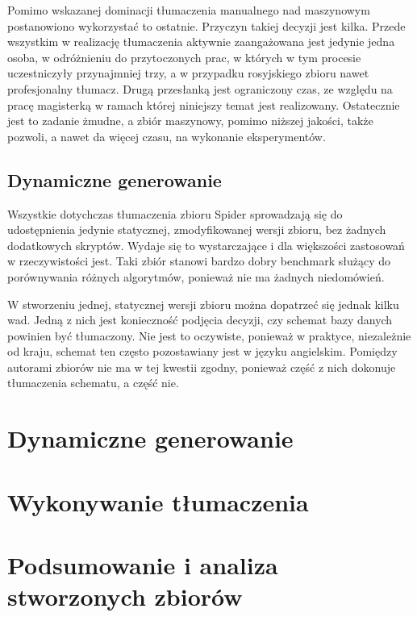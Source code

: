 Pomimo wskazanej dominacji tłumaczenia manualnego nad maszynowym postanowiono wykorzystać to ostatnie. Przyczyn takiej decyzji jest kilka. Przede wszystkim w realizację tłumaczenia aktywnie zaangażowana jest jedynie jedna osoba, w odróżnieniu do przytoczonych prac, w których w tym procesie uczestniczyły przynajmniej trzy, a w przypadku rosyjskiego zbioru nawet profesjonalny tłumacz. Drugą przesłanką jest ograniczony czas, ze względu na pracę magisterką w ramach której niniejszy temat jest realizowany. Ostatecznie jest to zadanie żmudne, a zbiór maszynowy, pomimo niższej jakości, także pozwoli, a nawet da więcej czasu, na wykonanie eksperymentów.

\subsection{Dynamiczne generowanie}
Wszystkie dotychczas tłumaczenia zbioru Spider sprowadzają się do udostępnienia jedynie statycznej, zmodyfikowanej wersji zbioru, bez żadnych dodatkowych skryptów. Wydaje się to wystarczające i dla większości zastosowań w rzeczywistości jest. Taki zbiór stanowi bardzo dobry benchmark służący do porównywania różnych algorytmów, ponieważ nie ma żadnych niedomówień.

W stworzeniu jednej, statycznej wersji zbioru można dopatrzeć się jednak kilku wad. Jedną z nich jest konieczność podjęcia decyzji, czy schemat bazy danych powinien być tłumaczony. Nie jest to oczywiste, ponieważ w praktyce, niezależnie od kraju, schemat ten często pozostawiany jest w języku angielskim. Pomiędzy autorami zbiorów nie ma w tej kwestii zgodny, ponieważ część z nich dokonuje tłumaczenia schematu, a część nie.

\section{Dynamiczne generowanie}

\section{Wykonywanie tłumaczenia}

\section{Podsumowanie i analiza stworzonych zbiorów}
